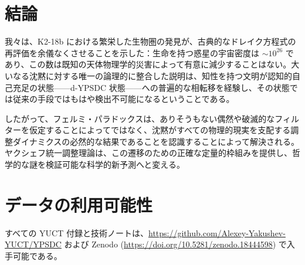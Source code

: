 \documentclass[11pt,a4paper]{article}
\begin{document}
	\section{結論}
	\label{sec:conclusions}
	我々は、K2-18b における繁栄した生物圏の発見が、古典的なドレイク方程式の再評価を余儀なくさせることを示した：生命を持つ惑星の宇宙密度は \(\sim 10^{26}\) であり、この数は既知の天体物理学的災害によって有意に減少することはない。大いなる沈黙に対する唯一の論理的に整合した説明は、知性を持つ文明が認知的自己充足の状態——d-YPSDC 状態——への普遍的な相転移を経験し、その状態では従来の手段ではもはや検出不可能になるということである。
	
	したがって、フェルミ・パラドックスは、ありそうもない偶然や破滅的なフィルターを仮定することによってではなく、沈黙がすべての物理的現実を支配する調整ダイナミクスの必然的な結果であることを認識することによって解決される。ヤクシェフ統一調整理論は、この遷移のための正確な定量的枠組みを提供し、哲学的な謎を検証可能な科学的新予測へと変える。
	
	\section*{データの利用可能性}
	すべての YUCT 付録と技術ノートは、\url{https://github.com/Alexey-Yakushev-YUCT/YPSDC} および Zenodo (\url{https://doi.org/10.5281/zenodo.18444598}) で入手可能である。
	
\end{document}
